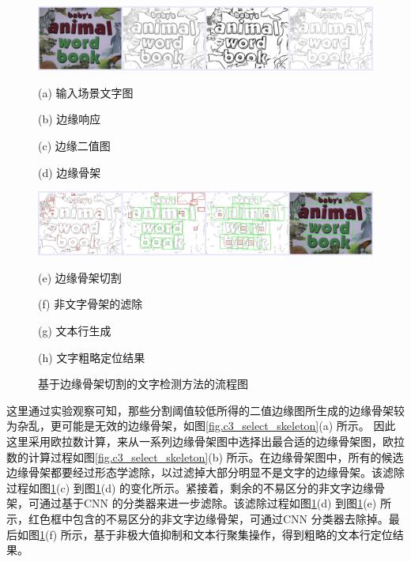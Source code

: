     \begin{figure}[htbp]
    \centering
    \includegraphics[width=\textwidth]{./figures/c3_overview_1.jpg}
    \begin{minipage}[t]{0.22\linewidth}
    \centerline{ \small (a) 输入场景文字图}
    \end{minipage}
    \begin{minipage}[t]{0.22\linewidth}
    \centerline{ \small (b) 边缘响应}
    \end{minipage}
    \begin{minipage}[t]{0.22\linewidth}
    \centerline{ \small (c) 边缘二值图}
    \end{minipage}
    \begin{minipage}[t]{0.22\linewidth}
    \centerline{ \small (d) 边缘骨架}
    \end{minipage}
    \includegraphics[width=\textwidth]{./figures/c3_overview_2.jpg}
    \begin{minipage}[t]{0.22\linewidth}
    \centerline{ \small (e) 边缘骨架切割}
    \end{minipage}
    \begin{minipage}[t]{0.22\linewidth}
    \centerline{ \small (f) 非文字骨架的滤除}
    \end{minipage}
    \begin{minipage}[t]{0.22\linewidth}
    \centerline{ \small (g) 文本行生成}
    \end{minipage}
    \begin{minipage}[t]{0.22\linewidth}
    \centerline{ \small (h) 文字粗略定位结果}
    \end{minipage}
    \caption{基于边缘骨架切割的文字检测方法的流程图}
    \label{fig.c3_overview}
    \end{figure}

    这里通过实验观察可知，那些分割阈值较低所得的二值边缘图所生成的边缘骨架较为杂乱，更可能是无效的边缘骨架，如图\ref{fig.c3_select_skeleton}(a) 所示。
    因此这里采用欧拉数计算，来从一系列边缘骨架图中选择出最合适的边缘骨架图，欧拉数的计算过程如图\ref{fig.c3_select_skeleton}(b) 所示。在边缘骨架图中，所有的候选边缘骨架都要经过形态学滤除，以过滤掉大部分明显不是文字的边缘骨架。该滤除过程如图\ref{fig.c3_overview}(c) 到图\ref{fig.c3_overview}(d) 的变化所示。紧接着，剩余的不易区分的非文字边缘骨架，可通过基于CNN 的分类器来进一步滤除。该滤除过程如图\ref{fig.c3_overview}(d) 到图\ref{fig.c3_overview}(e) 所示，红色框中包含的不易区分的非文字边缘骨架，可通过CNN 分类器去除掉。最后如图\ref{fig.c3_overview}(f) 所示，基于非极大值抑制和文本行聚集操作，得到粗略的文本行定位结果。

